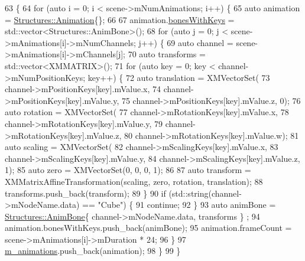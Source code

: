 \begin{DoxyCode}
63 \{
64     \textcolor{keywordflow}{for} (\textcolor{keyword}{auto} i = 0; i < scene->mNumAnimations; i++) \{
65         \textcolor{keyword}{auto} animation = \mbox{\hyperlink{struct_structures_1_1_animation}{Structures::Animation}}\{\};
66 
67         animation.\mbox{\hyperlink{struct_structures_1_1_animation_a6726c126620084018287d0f9211db2b8}{bonesWithKeys}} = std::vector<Structures::AnimBone>();
68         \textcolor{keywordflow}{for} (\textcolor{keyword}{auto} j = 0; j < scene->mAnimations[i]->mNumChannels; j++) \{
69             \textcolor{keyword}{auto} channel = scene->mAnimations[i]->mChannels[j];
70             \textcolor{keyword}{auto} transforms = std::vector<XMMATRIX>();
71             \textcolor{keywordflow}{for} (\textcolor{keyword}{auto} key = 0; key < channel->mNumPositionKeys; key++) \{
72                 \textcolor{keyword}{auto} translation = XMVectorSet(
73                     channel->mPositionKeys[key].mValue.x,
74                     channel->mPositionKeys[key].mValue.y,
75                     channel->mPositionKeys[key].mValue.z, 0);
76                 \textcolor{keyword}{auto} rotation = XMVectorSet(
77                     channel->mRotationKeys[key].mValue.x,
78                     channel->mRotationKeys[key].mValue.y,
79                     channel->mRotationKeys[key].mValue.z,
80                     channel->mRotationKeys[key].mValue.w);
81                 \textcolor{keyword}{auto} scaling = XMVectorSet(
82                     channel->mScalingKeys[key].mValue.x,
83                     channel->mScalingKeys[key].mValue.y,
84                     channel->mScalingKeys[key].mValue.z, 1);
85                 \textcolor{keyword}{auto} zero = XMVectorSet(0, 0, 0, 1);
86 
87                 \textcolor{keyword}{auto} transform = XMMatrixAffineTransformation(scaling, zero, rotation, translation);
88                 transforms.push\_back(transform);
89             \}
90             \textcolor{keywordflow}{if} (std::string(channel->mNodeName.data) == \textcolor{stringliteral}{"Cube"}) \{
91                 \textcolor{keywordflow}{continue};
92             \}
93             \textcolor{keyword}{auto} animBone = \mbox{\hyperlink{struct_structures_1_1_anim_bone}{Structures::AnimBone}}\{ channel->mNodeName.data, transforms \}
      ;
94             animation.bonesWithKeys.push\_back(animBone);
95             animation.frameCount = scene->mAnimations[i]->mDuration * 24;
96         \}
97         \mbox{\hyperlink{class_model_loader_a2b9cf4d8fe3432ddc656651057c78860}{m\_animations}}.push\_back(animation);
98     \}
99 \}
\end{DoxyCode}
\mbox{\label{class_model_loader_a77713e17f817861d8b6b3b166248abe7}} 
